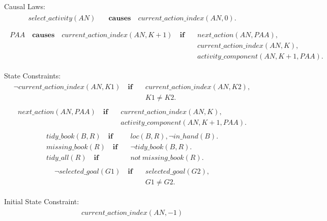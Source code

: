 \documentclass[11pt, oneside]{article}
\begin{document}
Causal Laws:
\begin{align}\begin{split}
 select\_activity(AN)\quad &\mathbf{causes} \quad current\_action\_index(AN, 0). \\
\end{split}\end{align}
\begin{align}\begin{split}
PAA\quad \mathbf{causes} \quad current\_action\_index(AN, K+1)\quad \mathbf{if}\quad &next\_action(AN, PAA), \\
&current\_action\_index(AN, K),\\
&activity\_component(AN, K+1, PAA).
\end{split}\end{align}

State Constraints:
\begin{align}\begin{split}
\neg current\_action\_index(AN, K1)  \quad  \mathbf{if}\quad & current\_action\_index(AN, K2), \\
\quad & K1\neq K2.
\end{split}\end{align}
\begin{align}\begin{split}
next\_action(AN, PAA)\quad \mathbf{if}\quad & current\_action\_index(AN, K),\\
&activity\_component(AN, K+1, PAA).
\end{split}\end{align}
\begin{align}\begin{split}
tidy\_book(B,R) \quad \mathbf{if}\quad & loc(B,R), \neg in\_hand(B).\\
missing\_book(R) \quad \mathbf{if}\quad &\neg tidy\_book(B,R).\\
tidy\_all(R) \quad \mathbf{if}\quad & not\ missing\_book(R).
\end{split}\end{align}
\begin{align}\begin{split}
\neg selected\_goal(G1) \quad \mathbf{if}\quad &selected\_goal(G2),\\&G1\neq G2.
\end{split}\end{align}


Initial State Constraint:
\begin{align}\begin{split}
current\_action\_index(AN,-1)
\end{split}\end{align}
\end{document}
